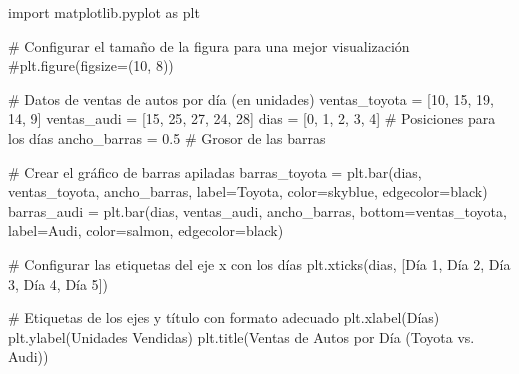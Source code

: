 \documentclass[
  jou,
  floatsintext,
  longtable,
  a4paper,
  nolmodern,
  notxfonts,
  notimes,
  12pt,
  colorlinks=true,linkcolor=blue,citecolor=blue,urlcolor=blue]{apa7}
\newenvironment{Shaded}{\begin{snugshade}}{\end{snugshade}}
\newcommand{\CommentTok}[1]{\textcolor[rgb]{0.37,0.37,0.37}{#1}}
\newcommand{\DecValTok}[1]{\textcolor[rgb]{0.68,0.00,0.00}{#1}}
\newcommand{\FloatTok}[1]{\textcolor[rgb]{0.68,0.00,0.00}{#1}}
\newcommand{\ImportTok}[1]{\textcolor[rgb]{0.00,0.46,0.62}{#1}}
\newcommand{\NormalTok}[1]{\textcolor[rgb]{0.00,0.23,0.31}{#1}}
\newcommand{\OperatorTok}[1]{\textcolor[rgb]{0.37,0.37,0.37}{#1}}
\newcommand{\StringTok}[1]{\textcolor[rgb]{0.13,0.47,0.30}{#1}}
\begin{document}
\begin{Shaded}
\begin{Highlighting}[]
\ImportTok{import}\NormalTok{ matplotlib.pyplot }\ImportTok{as}\NormalTok{ plt}

\CommentTok{\# Configurar el tamaño de la figura para una mejor visualización}
\CommentTok{\#plt.figure(figsize=(10, 8))}

\CommentTok{\# Datos de ventas de autos por día (en unidades)}
\NormalTok{ventas\_toyota }\OperatorTok{=}\NormalTok{ [}\DecValTok{10}\NormalTok{, }\DecValTok{15}\NormalTok{, }\DecValTok{19}\NormalTok{, }\DecValTok{14}\NormalTok{, }\DecValTok{9}\NormalTok{]}
\NormalTok{ventas\_audi }\OperatorTok{=}\NormalTok{ [}\DecValTok{15}\NormalTok{, }\DecValTok{25}\NormalTok{, }\DecValTok{27}\NormalTok{, }\DecValTok{24}\NormalTok{, }\DecValTok{28}\NormalTok{]}
\NormalTok{dias }\OperatorTok{=}\NormalTok{ [}\DecValTok{0}\NormalTok{, }\DecValTok{1}\NormalTok{, }\DecValTok{2}\NormalTok{, }\DecValTok{3}\NormalTok{, }\DecValTok{4}\NormalTok{]  }\CommentTok{\# Posiciones para los días}
\NormalTok{ancho\_barras }\OperatorTok{=} \FloatTok{0.5}  \CommentTok{\# Grosor de las barras}

\CommentTok{\# Crear el gráfico de barras apiladas}
\NormalTok{barras\_toyota }\OperatorTok{=}\NormalTok{ plt.bar(dias, ventas\_toyota, ancho\_barras, label}\OperatorTok{=}\StringTok{\textquotesingle{}Toyota\textquotesingle{}}\NormalTok{, color}\OperatorTok{=}\StringTok{\textquotesingle{}skyblue\textquotesingle{}}\NormalTok{, edgecolor}\OperatorTok{=}\StringTok{\textquotesingle{}black\textquotesingle{}}\NormalTok{)}
\NormalTok{barras\_audi }\OperatorTok{=}\NormalTok{ plt.bar(dias, ventas\_audi, ancho\_barras, bottom}\OperatorTok{=}\NormalTok{ventas\_toyota, label}\OperatorTok{=}\StringTok{\textquotesingle{}Audi\textquotesingle{}}\NormalTok{, color}\OperatorTok{=}\StringTok{\textquotesingle{}salmon\textquotesingle{}}\NormalTok{, edgecolor}\OperatorTok{=}\StringTok{\textquotesingle{}black\textquotesingle{}}\NormalTok{)}

\CommentTok{\# Configurar las etiquetas del eje x con los días}
\NormalTok{plt.xticks(dias, [}\StringTok{\textquotesingle{}Día 1\textquotesingle{}}\NormalTok{, }\StringTok{\textquotesingle{}Día 2\textquotesingle{}}\NormalTok{, }\StringTok{\textquotesingle{}Día 3\textquotesingle{}}\NormalTok{, }\StringTok{\textquotesingle{}Día 4\textquotesingle{}}\NormalTok{, }\StringTok{\textquotesingle{}Día 5\textquotesingle{}}\NormalTok{])}

\CommentTok{\# Etiquetas de los ejes y título con formato adecuado}
\NormalTok{plt.xlabel(}\StringTok{\textquotesingle{}Días\textquotesingle{}}\NormalTok{)}
\NormalTok{plt.ylabel(}\StringTok{\textquotesingle{}Unidades Vendidas\textquotesingle{}}\NormalTok{)}
\NormalTok{plt.title(}\StringTok{\textquotesingle{}Ventas de Autos por Día (Toyota vs. Audi)\textquotesingle{}}\NormalTok{)}


\end{Highlighting}
\end{Shaded}
\end{document}
